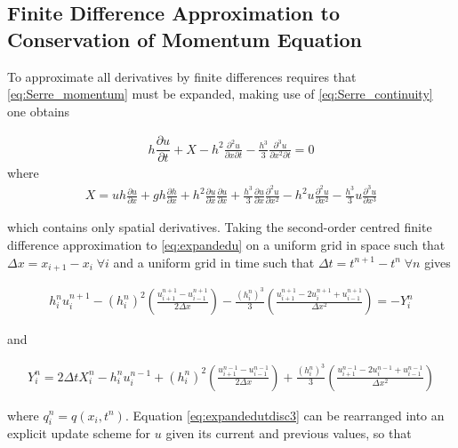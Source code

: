 \documentclass[SingleSpace,12pt,Journal]{Serre_ASCE}
\begin{document}
\subsection{Finite Difference Approximation to Conservation of Momentum Equation} 
\label{subsec:FDA2conmom}
To approximate all derivatives by finite differences requires that \eqref{eq:Serre_momentum} must be expanded, making use of \eqref{eq:Serre_continuity} one obtains
\begin{linenomath*}
\begin{gather}
h\dfrac{\partial u}{\partial t} + X - h^2\frac{\partial^2 u}{\partial x \partial t} - \frac{h^3}{3}\frac{\partial^3 u}{\partial x^2 \partial t}  =0 
\label{eq:expandedu}
\end{gather}
where
\begin{gather*}
X = uh\frac{\partial u}{\partial x} + gh\frac{\partial h}{\partial x} + h^2\frac{\partial u}{\partial x}\frac{\partial u}{\partial x} + \frac{h^3}{3}\frac{\partial u}{\partial x}\frac{\partial^2 u}{\partial x^2} - h^2u\frac{\partial^2 u}{\partial x^2}- \frac{h^3}{3}u\frac{\partial^3 u}{\partial x^3}
\end{gather*}
\end{linenomath*} 
which contains only spatial derivatives.
Taking the second-order centred finite difference approximation to \eqref{eq:expandedu} on a uniform grid in space such that $\Delta x = x_{i+1} - x_i \; \forall i$ and a uniform grid in time such that $\Delta t = t^{n+1} - t^{n} \; \forall n$ gives
\begin{linenomath*}
\begin{gather}
h^{n}_iu^{n+1}_i - \left(h^{n}_i\right)^2 \left(\frac{u^{n+1}_{i+1} -u^{n+1}_{i-1} }{2 \Delta x}\right) - \frac{\left(h^{n}_i\right)^3}{3}\left(\frac{u^{n+1}_{i+1} - 2u^{n+1}_{i} + u^{n+1}_{i-1} }{\Delta x^2}\right) = - Y^n_i
\label{eq:expandedutdisc3}
\end{gather}
\end{linenomath*}
and
\begin{linenomath*}
\begin{gather*}
Y_i^n = 2\Delta tX_i^{n} - h_i^{n}u_i^{n-1} + \left(h_i^{n}\right)^2\left(\frac{u^{n-1}_{i+1} -u^{n-1}_{i-1} }{2 \Delta x}\right) + \frac{\left(h_i^{n}\right)^3}{3}\left(\frac{u^{n-1}_{i+1} - 2u^{n-1}_{i} + u^{n-1}_{i-1} }{\Delta x^2}\right)
\label{eq:expandfactor Xp}
\end{gather*}
\end{linenomath*}
where $q_i^n = q(x_i,t^n)$. Equation \eqref{eq:expandedutdisc3} can be rearranged into an explicit update scheme for $u$ given its current and previous values, so that
\end{document}
